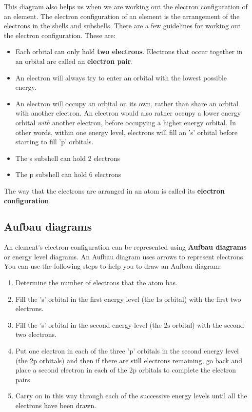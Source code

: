 \label{m38741*eip-752}This diagram also helps us when we are working out the electron configuration of an element. The electron configuration of an element is the arrangement of the electrons in the shells and subshells. There are a few guidelines for working out the electron configuration. These are:
\par \label{m38741*id259303}\begin{itemize}[noitemsep]
            \label{m38741*uid93}\item Each orbital can only hold \textbf{two electrons}. Electrons that occur together in an orbital are called an \textbf{electron pair}.
\label{m38741*uid94}\item An electron will always try to enter an orbital with the lowest possible energy.
\label{m38741*uid95}\item An electron will occupy an orbital on its own, rather than share an orbital with another electron. An electron would also rather occupy a lower energy orbital \textsl{with} another electron, before occupying a higher energy orbital. In other words, within one energy level, electrons will fill an 's' orbital before starting to fill 'p' orbitals.
\label{m38741*uid83}\item The s subshell can hold 2 electrons
\label{m38741*uid84}\item The p subshell can hold 6 electrons
\end{itemize}
        \label{m38741*id259599}The way that the electrons are arranged in an atom is called its \textbf{electron configuration}.

\subsection*{Aufbau diagrams}        
\label{m38741*id259628}An element's electron configuration can be represented using \textbf{Aufbau diagrams} or energy level diagrams. An Aufbau diagram uses arrows to represent electrons. You can use the following steps to help you to draw an Aufbau diagram:
        \label{m38741*id259639}\begin{enumerate}[noitemsep, label=\textbf{\arabic*}. ] 
\item Determine the number of electrons that the atom has.
\item Fill the 's' orbital in the first energy level (the $1\text{s}$ orbital) with the first two electrons.
\item Fill the 's' orbital in the second energy level (the $2\text{s}$ orbital) with the second two electrons.
\item Put one electron in each of the three 'p' orbitals in the second energy level (the $2\text{p}$ orbitals) and then if there are still electrons remaining, go back and place a second electron in each of the $2\text{p}$ orbitals to complete the electron pairs.
\item Carry on in this way through each of the successive energy levels until all the electrons have been drawn.
\end{enumerate}

